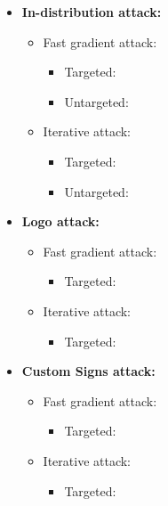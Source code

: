  \begin{itemize}
 	\item \textbf{In-distribution attack:}
 	\begin{itemize}
 		\item Fast gradient attack:
		\begin{itemize}
			\item Targeted:
			\item Untargeted: 
		\end{itemize}
		\item Iterative attack:
		\begin{itemize}
			\item Targeted:
			\item Untargeted:
		\end{itemize}
	\end{itemize}
	
	\item \textbf{Logo attack:}
	 	\begin{itemize}
 		\item Fast gradient attack:
		\begin{itemize}
			\item Targeted:
		\end{itemize}
		\item Iterative attack:
		\begin{itemize}
			\item Targeted:
		\end{itemize}
	\end{itemize}
	
	\item \textbf{Custom Signs attack:}
	 	\begin{itemize}
 		\item Fast gradient attack:
		\begin{itemize}
			\item Targeted:
		\end{itemize}
		\item Iterative attack:
		\begin{itemize}
			\item Targeted:
		\end{itemize}
	\end{itemize}
\end{itemize}



